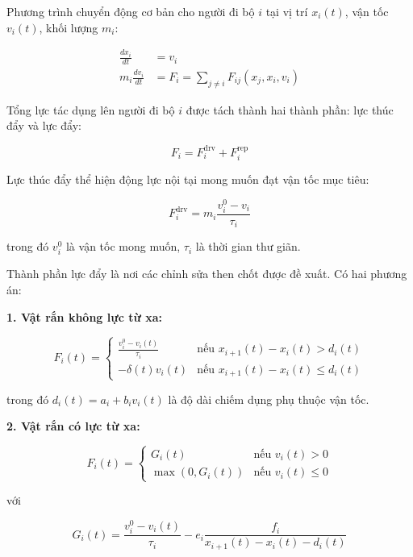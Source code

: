 \documentclass[12pt,a4paper]{article}
\begin{document}
Phương trình chuyển động cơ bản cho người đi bộ $i$ tại vị trí $x_i(t)$, vận tốc $v_i(t)$, khối lượng $m_i$:

\begin{align}
\frac{dx_i}{dt} &= v_i \\
m_i \frac{dv_i}{dt} &= F_i = \sum_{j \neq i} F_{ij}(x_j, x_i, v_i)
\end{align}

Tổng lực tác dụng lên người đi bộ $i$ được tách thành hai thành phần: lực thúc đẩy và lực đẩy:

\begin{equation}
F_i = F_i^{\text{drv}} + F_i^{\text{rep}}
\end{equation}

Lực thúc đẩy thể hiện động lực nội tại mong muốn đạt vận tốc mục tiêu:

\begin{equation}
F_i^{\text{drv}} = m_i \frac{v_i^0 - v_i}{\tau_i}
\end{equation}

trong đó $v_i^0$ là vận tốc mong muốn, $\tau_i$ là thời gian thư giãn.

Thành phần lực đẩy là nơi các chỉnh sửa then chốt được đề xuất. Có hai phương án:

\textbf{1. Vật rắn không lực từ xa:}

\begin{equation}
F_i(t) = \begin{cases}
\frac{v_i^0 - v_i(t)}{\tau_i} & \text{nếu } x_{i+1}(t) - x_i(t) > d_i(t) \\
-\delta(t) v_i(t) & \text{nếu } x_{i+1}(t) - x_i(t) \leq d_i(t)
\end{cases}
\end{equation}

trong đó $d_i(t) = a_i + b_i v_i(t)$ là độ dài chiếm dụng phụ thuộc vận tốc.

\textbf{2. Vật rắn có lực từ xa:}

\begin{equation}
F_i(t) = \begin{cases}
G_i(t) & \text{nếu } v_i(t) > 0 \\
\max(0, G_i(t)) & \text{nếu } v_i(t) \leq 0
\end{cases}
\end{equation}

với

\begin{equation}
G_i(t) = \frac{v_i^0 - v_i(t)}{\tau_i} - e_i \frac{f_i}{x_{i+1}(t) - x_i(t) - d_i(t)}
\end{equation}
\end{document}
